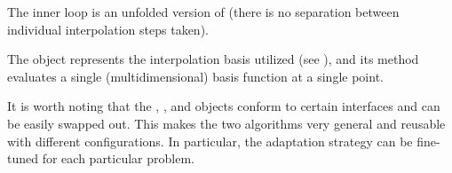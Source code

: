 \begin{compactlist}

 The inner loop is an unfolded version of 
(there is no separation between individual interpolation steps taken).

 The  object represents the interpolation basis
utilized (see ), and its  method evaluates a single
(multidimensional) basis function at a single point.

\end{compactlist}

It is worth noting that the , , and 
objects conform to certain interfaces and can be easily swapped out. This makes
the two algorithms very general and reusable with different configurations. In
particular, the adaptation strategy can be fine-tuned for each particular
problem.
